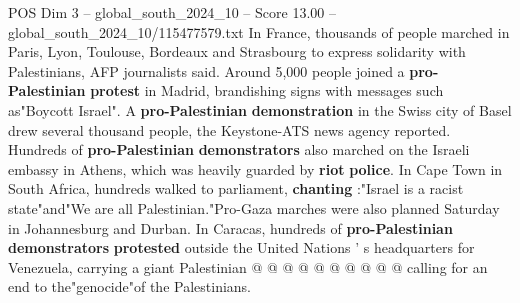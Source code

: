 \begin{textsample}{POS Dim 3 – global\_south\_2024\_10 – Score 13.00 – global\_south\_2024\_10/115477579.txt}
In France, thousands of people marched in Paris, Lyon, Toulouse, Bordeaux and Strasbourg to express solidarity with Palestinians, AFP journalists said.
Around 5,000 people joined a \textbf{pro-Palestinian} \textbf{protest} in Madrid, brandishing signs with messages such as"Boycott Israel".
A \textbf{pro-Palestinian} \textbf{demonstration} in the Swiss city of Basel drew several thousand people, the Keystone-ATS news agency reported.
Hundreds of \textbf{pro-Palestinian} \textbf{demonstrators} also marched on the Israeli embassy in Athens, which was heavily guarded by \textbf{riot} \textbf{police}.
In Cape Town in South Africa, hundreds walked to parliament, \textbf{chanting} :"Israel is a racist state"and"We are all Palestinian."Pro-Gaza marches were also planned Saturday in Johannesburg and Durban.
In Caracas, hundreds of \textbf{pro-Palestinian} \textbf{demonstrators} \textbf{protested} outside the United Nations ' s headquarters for Venezuela, carrying a giant Palestinian @ @ @ @ @ @ @ @ @ @ calling for an end to the"genocide"of the Palestinians.

\end{textsample}
